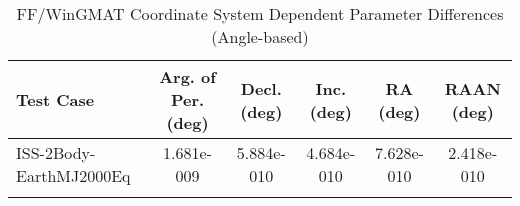 \begin{table}[htbp!]
\centering
\caption{ FF/WinGMAT Coordinate System Dependent Parameter Differences (Angle-based)}
      \begin{tabular}{lccccc}
      \hline\hline
          Test Case & Arg. of Per. (deg) & Decl. (deg) & Inc. (deg) & RA (deg) & RAAN (deg) \\
         \hline
         ISS-2Body-EarthMJ2000Eq & 1.681e-009 & 5.884e-010 & 4.684e-010 & 7.628e-010 & 2.418e-010 \\
      \hline\hline
      \label{Table: FF-WinGMAT CS Parameters Set 5} 
\end{tabular}
\end{table}
